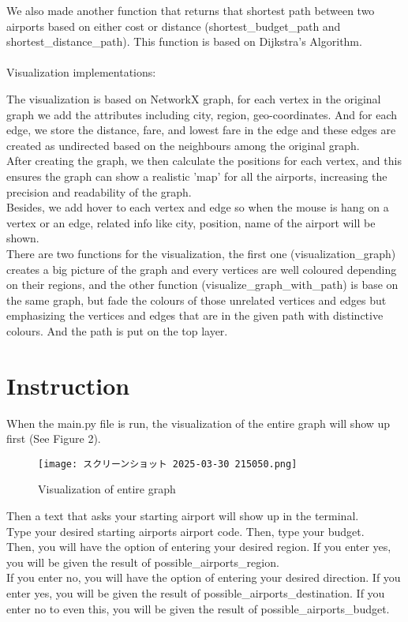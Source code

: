 \documentclass[fontsize=11pt]{article}
\begin{document}
We also made another function that returns that shortest path between two airports based on either cost or distance (shortest\_budget\_path and shortest\_distance\_path). This function is based on Dijkstra's Algorithm.\\
\\
Visualization implementations:\\
\begin{addmargin}[0.5cm]{0pt}
    The visualization is based on NetworkX graph, for each vertex in the original graph we add the attributes including city, region, geo-coordinates.
    And for each edge, we store the distance, fare, and lowest fare in the edge and these edges are created as undirected based on the neighbours among the original graph.\\
    After creating the graph, we then calculate the positions for each vertex, and this ensures the graph can show a realistic 'map' for all the airports, increasing the precision and readability of the graph.\\
    Besides, we add hover to each vertex and edge so when the mouse is hang on a vertex or an edge, related info like city, position, name of the airport will be shown.\\
    There are two functions for the visualization, the first one (visualization\_graph) creates a big picture of the graph and every vertices are well coloured depending on their regions, and the other function (visualize\_graph\_with\_path) is base on the same graph, but fade the colours of those unrelated vertices and edges but emphasizing the vertices and edges that are in the given path with distinctive colours. And the path is put on the top layer.\\
\end{addmargin}

\section*{Instruction}
When the main.py file is run, the visualization of the entire graph will show up first (See Figure 2).\\
\begin{figure}
    \centering
    \texttt{[image: スクリーンショット 2025-03-30 215050.png]}
    \caption{Visualization of entire graph}
    \label{fig:enter-label}
\end{figure}

Then a text that asks your starting airport will show up in the terminal.\\
Type your desired starting airports airport code. Then, type your budget.\\
Then, you will have the option of entering your desired region. If you enter yes, you will be given the result of possible\_airports\_region.\\
If you enter no, you will have the option of entering your desired direction. If you enter yes, you will be given the result of possible\_airports\_destination. 
If you enter no to even this, you will be given the result of possible\_airports\_budget.\\
\end{document}
